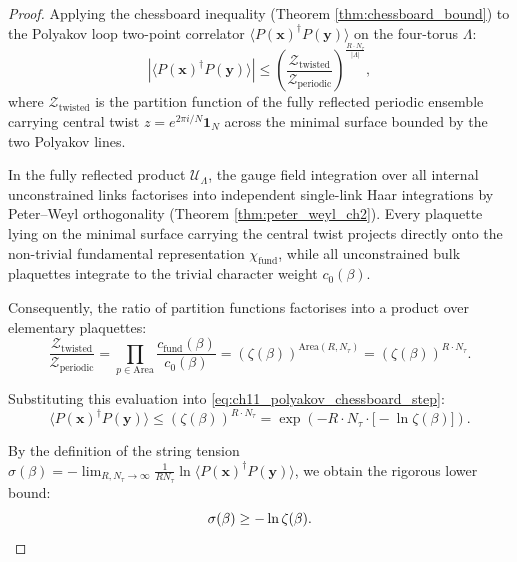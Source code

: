 \begin{proof}
Applying the chessboard inequality (Theorem \ref{thm:chessboard_bound}) to the Polyakov loop two-point correlator $\langle P(\mathbf{x})^\dagger P(\mathbf{y}) \rangle$ on the four-torus $\Lambda$:
\begin{equation}
\label{eq:ch11_polyakov_chessboard_step}
\left| \langle P(\mathbf{x})^\dagger P(\mathbf{y}) \rangle \right| \le \left( \frac{\mathcal{Z}_{\mathrm{twisted}}}{\mathcal{Z}_{\mathrm{periodic}}} \right)^{\frac{R \cdot N_\tau}{|\Lambda|}},
\end{equation}
where $\mathcal{Z}_{\mathrm{twisted}}$ is the partition function of the fully reflected periodic ensemble carrying central twist $z = e^{2\pi i / N} \mathbf{1}_N$ across the minimal surface bounded by the two Polyakov lines.

In the fully reflected product $\mathcal{U}_\Lambda$, the gauge field integration over all internal unconstrained links factorises into independent single-link Haar integrations by Peter--Weyl orthogonality (Theorem \ref{thm:peter_weyl_ch2}). 
Every plaquette lying on the minimal surface carrying the central twist projects directly onto the non-trivial fundamental representation $\chi_{\mathrm{fund}}$, while all unconstrained bulk plaquettes integrate to the trivial character weight $c_0(\beta)$.

Consequently, the ratio of partition functions factorises into a product over elementary plaquettes:
\begin{equation}
\frac{\mathcal{Z}_{\mathrm{twisted}}}{\mathcal{Z}_{\mathrm{periodic}}} = \prod_{p \in \mathrm{Area}} \frac{c_{\mathrm{fund}}(\beta)}{c_0(\beta)} = \left( \zeta(\beta) \right)^{\mathrm{Area}(R, N_\tau)} = \left( \zeta(\beta) \right)^{R \cdot N_\tau}.
\end{equation}

Substituting this evaluation into \eqref{eq:ch11_polyakov_chessboard_step}:
\begin{equation}
\langle P(\mathbf{x})^\dagger P(\mathbf{y}) \rangle \le \left( \zeta(\beta) \right)^{R \cdot N_\tau} = \exp\left( -R \cdot N_\tau \cdot \bigl[ -\ln \zeta(\beta) \bigr] \right).
\end{equation}

By the definition of the string tension $\sigma(\beta) = -\lim_{R, N_\tau \to \infty} \frac{1}{R N_\tau} \ln \langle P(\mathbf{x})^\dagger P(\mathbf{y}) \rangle$, we obtain the rigorous lower bound:
\begin{equation}
\sigma(\beta) \ge -\ln \zeta(\beta). \qedhere
\end{equation}
\end{proof}

